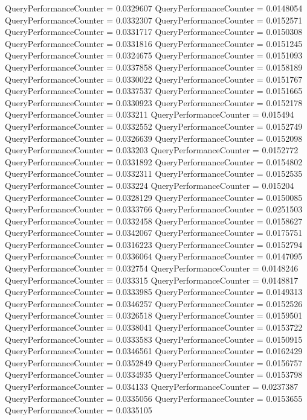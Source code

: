\documentclass[9pt]{article}
\theoremstyle{plain}
\theoremstyle{definition}
\theoremstyle{remark}
\numberwithin{equation}{section}
\begin{document}
QueryPerformanceCounter  =  0.0329607
QueryPerformanceCounter  =  0.0148054
QueryPerformanceCounter  =  0.0332307
QueryPerformanceCounter  =  0.0152571
QueryPerformanceCounter  =  0.0331717
QueryPerformanceCounter  =  0.0150308
QueryPerformanceCounter  =  0.0331816
QueryPerformanceCounter  =  0.0151245
QueryPerformanceCounter  =  0.0324675
QueryPerformanceCounter  =  0.0151093
QueryPerformanceCounter  =  0.0337858
QueryPerformanceCounter  =  0.0158189
QueryPerformanceCounter  =  0.0330022
QueryPerformanceCounter  =  0.0151767
QueryPerformanceCounter  =  0.0337537
QueryPerformanceCounter  =  0.0151665
QueryPerformanceCounter  =  0.0330923
QueryPerformanceCounter  =  0.0152178
QueryPerformanceCounter  =  0.033211
QueryPerformanceCounter  =  0.015494
QueryPerformanceCounter  =  0.0332552
QueryPerformanceCounter  =  0.0152749
QueryPerformanceCounter  =  0.0326639
QueryPerformanceCounter  =  0.0152098
QueryPerformanceCounter  =  0.033203
QueryPerformanceCounter  =  0.0152772
QueryPerformanceCounter  =  0.0331892
QueryPerformanceCounter  =  0.0154802
QueryPerformanceCounter  =  0.0332311
QueryPerformanceCounter  =  0.0152535
QueryPerformanceCounter  =  0.033224
QueryPerformanceCounter  =  0.015204
QueryPerformanceCounter  =  0.0328129
QueryPerformanceCounter  =  0.0150085
QueryPerformanceCounter  =  0.0333766
QueryPerformanceCounter  =  0.0251503
QueryPerformanceCounter  =  0.0332458
QueryPerformanceCounter  =  0.0158627
QueryPerformanceCounter  =  0.0342067
QueryPerformanceCounter  =  0.0175751
QueryPerformanceCounter  =  0.0316223
QueryPerformanceCounter  =  0.0152794
QueryPerformanceCounter  =  0.0336064
QueryPerformanceCounter  =  0.0147095
QueryPerformanceCounter  =  0.032754
QueryPerformanceCounter  =  0.0148246
QueryPerformanceCounter  =  0.033315
QueryPerformanceCounter  =  0.0148817
QueryPerformanceCounter  =  0.0333985
QueryPerformanceCounter  =  0.0149313
QueryPerformanceCounter  =  0.0346257
QueryPerformanceCounter  =  0.0152526
QueryPerformanceCounter  =  0.0326518
QueryPerformanceCounter  =  0.0159501
QueryPerformanceCounter  =  0.0338041
QueryPerformanceCounter  =  0.0153722
QueryPerformanceCounter  =  0.0333583
QueryPerformanceCounter  =  0.0150915
QueryPerformanceCounter  =  0.0346561
QueryPerformanceCounter  =  0.0162429
QueryPerformanceCounter  =  0.0352849
QueryPerformanceCounter  =  0.0156757
QueryPerformanceCounter  =  0.0334935
QueryPerformanceCounter  =  0.0153798
QueryPerformanceCounter  =  0.034133
QueryPerformanceCounter  =  0.0237387
QueryPerformanceCounter  =  0.0335056
QueryPerformanceCounter  =  0.0153655
QueryPerformanceCounter  =  0.0335105
\end{document}
